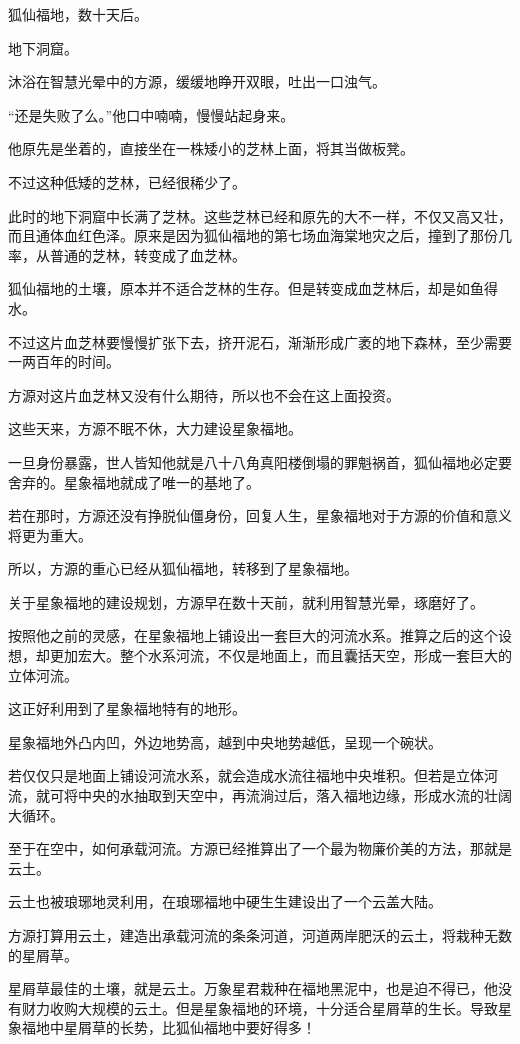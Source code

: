 \begin{this_body}
狐仙福地，数十天后。

地下洞窟。

沐浴在智慧光晕中的方源，缓缓地睁开双眼，吐出一口浊气。

“还是失败了么。”他口中喃喃，慢慢站起身来。

他原先是坐着的，直接坐在一株矮小的芝林上面，将其当做板凳。

不过这种低矮的芝林，已经很稀少了。

此时的地下洞窟中长满了芝林。这些芝林已经和原先的大不一样，不仅又高又壮，而且通体血红色泽。原来是因为狐仙福地的第七场血海棠地灾之后，撞到了那份几率，从普通的芝林，转变成了血芝林。

狐仙福地的土壤，原本并不适合芝林的生存。但是转变成血芝林后，却是如鱼得水。

不过这片血芝林要慢慢扩张下去，挤开泥石，渐渐形成广袤的地下森林，至少需要一两百年的时间。

方源对这片血芝林又没有什么期待，所以也不会在这上面投资。

这些天来，方源不眠不休，大力建设星象福地。

一旦身份暴露，世人皆知他就是八十八角真阳楼倒塌的罪魁祸首，狐仙福地必定要舍弃的。星象福地就成了唯一的基地了。

若在那时，方源还没有挣脱仙僵身份，回复人生，星象福地对于方源的价值和意义将更为重大。

所以，方源的重心已经从狐仙福地，转移到了星象福地。

关于星象福地的建设规划，方源早在数十天前，就利用智慧光晕，琢磨好了。

按照他之前的灵感，在星象福地上铺设出一套巨大的河流水系。推算之后的这个设想，却更加宏大。整个水系河流，不仅是地面上，而且囊括天空，形成一套巨大的立体河流。

这正好利用到了星象福地特有的地形。

星象福地外凸内凹，外边地势高，越到中央地势越低，呈现一个碗状。

若仅仅只是地面上铺设河流水系，就会造成水流往福地中央堆积。但若是立体河流，就可将中央的水抽取到天空中，再流淌过后，落入福地边缘，形成水流的壮阔大循环。

至于在空中，如何承载河流。方源已经推算出了一个最为物廉价美的方法，那就是云土。

云土也被琅琊地灵利用，在琅琊福地中硬生生建设出了一个云盖大陆。

方源打算用云土，建造出承载河流的条条河道，河道两岸肥沃的云土，将栽种无数的星屑草。

星屑草最佳的土壤，就是云土。万象星君栽种在福地黑泥中，也是迫不得已，他没有财力收购大规模的云土。但是星象福地的环境，十分适合星屑草的生长。导致星象福地中星屑草的长势，比狐仙福地中要好得多！


\end{this_body}
